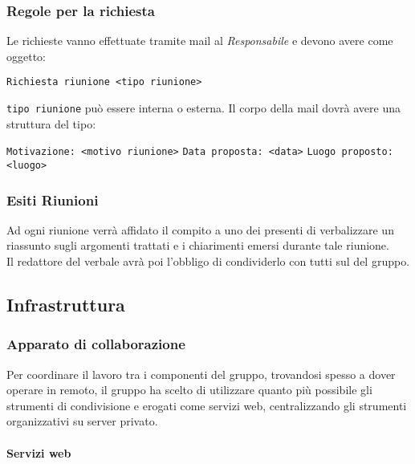 \documentclass{scalatekids-article}
\begin{document}
\subsubsection{Regole per la richiesta}

\label{sec:RegoleRichiesta}
Le richieste vanno effettuate tramite mail al \textit{Responsabile} e devono avere come oggetto:
\begin{center}
  \verb=Richiesta riunione <tipo riunione>=
\end{center}
\verb=tipo riunione= può essere interna o esterna.
Il corpo della mail dovrà avere una struttura del tipo:
\begin{center}
  \verb=Motivazione: <motivo riunione>=
  \verb=Data proposta: <data>=
  \verb=Luogo proposto: <luogo>=
\end{center}

\subsubsection{Esiti Riunioni}

Ad ogni riunione verrà affidato il compito a uno dei presenti di verbalizzare un riassunto sugli argomenti trattati e i chiarimenti emersi durante tale riunione.\\
Il redattore del verbale avrà poi l'obbligo di condividerlo con tutti sul  del gruppo.

\subsection{Infrastruttura}

\subsubsection{Apparato di collaborazione}

Per coordinare il lavoro tra i componenti del gruppo, trovandosi spesso a dover
operare in remoto, il gruppo ha scelto di utilizzare quanto più possibile gli
strumenti di condivisione e  erogati come servizi web,
centralizzando gli strumenti organizzativi su server privato.

\paragraph{Servizi web}
\end{document}

